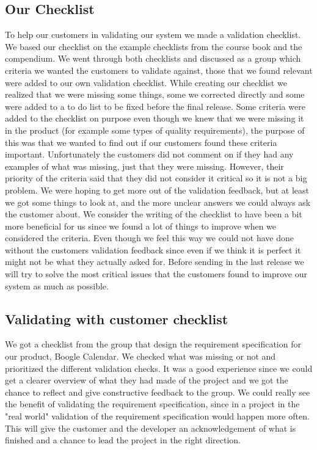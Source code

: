 \documentclass[a4paper]{article}
\begin{document}
			
			\subsection{Our Checklist}
				To help our customers in validating our system we made a validation checklist. We based our checklist on the example checklists from the course book and the compendium. We went through both checklists and discussed as a group which criteria we wanted the customers to validate against, those that we found relevant were added to our own validation checklist. While creating our checklist we realized that we were missing some things, some we corrected directly and some were added to a to do list to be fixed before the final release. Some criteria were added to the checklist on purpose even though we knew that we were missing it in the product (for example some types of quality requirements), the purpose of this was that we wanted to find out if our customers found these criteria important. Unfortunately the customers did not comment on if they had any examples of what was missing, just that they were missing. However, their priority of the criteria said that they did not consider it critical so it is not a big problem. We were hoping to get more out of the validation feedback, but at least we got some things to look at, and the more unclear answers we could always ask the customer about. We consider the writing of the checklist to have been a bit more beneficial for us since we found a lot of things to improve when we considered the criteria. Even though we feel this way we could not have done without the customers validation feedback since even if we think it is perfect it might not be what they actually asked for.
				Before sending in the last release we will try to solve the most critical issues that the customers found to improve our system as much as possible.
				 			
			\subsection{Validating with customer checklist}
				We got a checklist from the group that design the requirement specification for our product, Boogle Calendar. We checked what was missing or not and prioritized the different validation checks. It was a good experience since we could get a clearer overview of what they had made of the project and we got the chance to reflect and give constructive feedback to the group. We could really see the benefit of validating the requirement specification, since in a project in the "real world" validation of the requirement specification would happen more often. This will give the customer and the developer an acknowledgement of what is finished and a chance to lead the project in the right direction.
\end{document}
